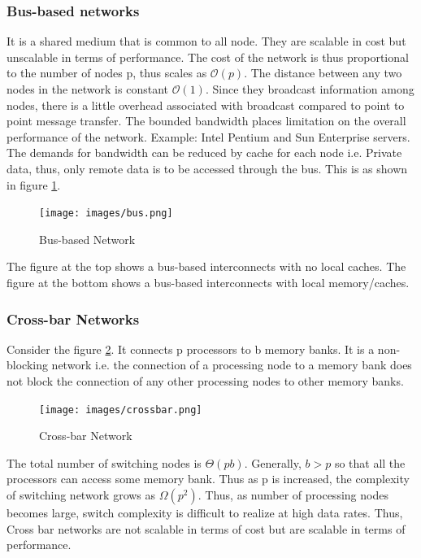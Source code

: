 \documentclass[12pt]{book}
\begin{document}
\subsubsection{Bus-based networks}
It is a shared medium that is common to all node. They are scalable in cost but unscalable in terms of performance.
The cost of the network is thus proportional to the number of nodes p, thus scales as $\mathcal{O}(p)$. The distance between any two nodes in the network is constant $\mathcal{O}(1)$.
Since they broadcast information among nodes, there is a little overhead associated with broadcast compared to point to point message transfer.
The bounded bandwidth places limitation on the overall performance of the network. Example: Intel Pentium and Sun Enterprise servers. The demands for bandwidth can be reduced by cache for
each node i.e. Private data, thus, only remote data is to be accessed through the bus.
This is as shown in figure \ref{fig:bus}.
\begin{figure}[H]
    \centering
    \texttt{[image: images/bus.png]}
    \caption{Bus-based Network}
    \label{fig:bus}
\end{figure}
The figure at the top shows a bus-based interconnects with no local caches.
The figure at the bottom shows a bus-based interconnects with local memory/caches.

\subsubsection{Cross-bar Networks}
Consider the figure \ref{fig:crossbar}. It connects p processors to b memory banks.
It is a non-blocking network i.e. the connection of a processing node to a memory bank does not block the connection
of any other processing nodes to other memory banks. 
\begin{figure}[H]
    \centering
    \texttt{[image: images/crossbar.png]}
    \caption{Cross-bar Network}
    \label{fig:crossbar}
\end{figure}
The total number of switching nodes is $\Theta(pb)$. Generally, $b>p$ so that 
all the processors can access some memory bank. Thus as p is increased, the complexity of switching network 
grows as $\Omega(p^2)$. Thus, as number of processing nodes becomes large, switch complexity is difficult to realize
at high data rates. Thus, Cross bar networks are not scalable in terms of cost but are scalable in terms of performance.
\end{document}

